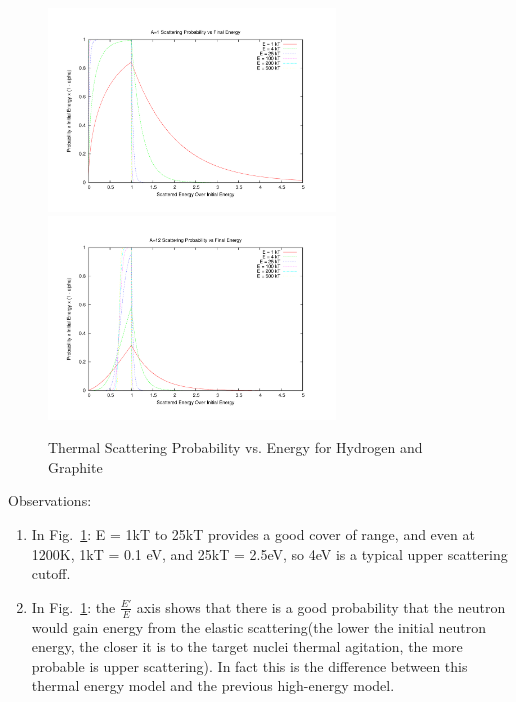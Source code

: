 \documentclass{school-22.211-notes}
\begin{document}
\begin{enumerate}
\begin{figure}[ht]
  \centering
  \includegraphics[width=3in]{images/sl-d/ts_H.uncrop.pdf}
  \includegraphics[width=3in]{images/sl-d/ts_C.uncrop.pdf}
  \caption{Thermal Scattering Probability vs. Energy for Hydrogen and Graphite} \label{ts-C-H}
\end{figure}
Observations: 
\begin{enumerate}
\item In Fig.~\ref{ts-C-H}: E = 1kT to 25kT provides a good cover of range, and even at 1200K, 1kT = 0.1 eV, and 25kT = 2.5eV, so 4eV is a typical upper scattering cutoff. 

\item In Fig.~\ref{ts-C-H}: the $\frac{E'}{E}$ axis shows that there is a good probability that the neutron would gain energy from the elastic scattering(the lower the initial neutron energy, the closer it is to the target nuclei thermal agitation, the more probable is upper scattering). In fact this is the difference between this thermal energy model and the previous high-energy model.  



\end{enumerate}
\end{enumerate}
\end{document}

